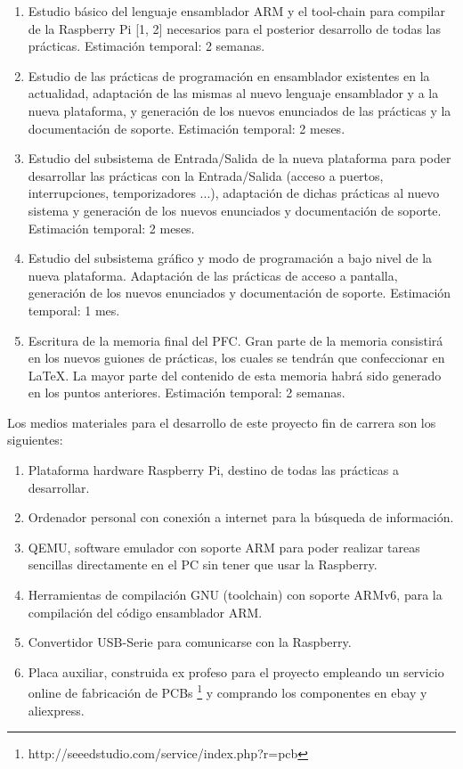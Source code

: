 \begin{enumerate}
  \item Estudio básico del lenguaje ensamblador ARM y el tool-chain para compilar de la
        Raspberry Pi [1, 2] necesarios para el posterior desarrollo de todas las prácticas. 
        Estimación temporal: 2 semanas.

  \item Estudio de las prácticas de programación en ensamblador existentes en la actualidad,
        adaptación de las mismas al nuevo lenguaje ensamblador y a la nueva plataforma,
        y generación de los nuevos enunciados de las prácticas y la documentación de soporte. 
        Estimación temporal: 2 meses.

  \item Estudio del subsistema de Entrada/Salida de la nueva plataforma para poder desarrollar
        las prácticas con la Entrada/Salida (acceso a puertos, interrupciones, temporizadores
        ...), adaptación de dichas prácticas al nuevo sistema y generación de los nuevos
        enunciados y documentación de soporte. 
        Estimación temporal: 2 meses.

  \item Estudio del subsistema gráfico y modo de programación a bajo nivel de la nueva
        plataforma. Adaptación de las prácticas de acceso a pantalla, generación de los
        nuevos enunciados y documentación de soporte. 
        Estimación temporal: 1 mes.

  \item Escritura de la memoria final del PFC. Gran parte de la memoria consistirá en los
        nuevos guiones de prácticas, los cuales se tendrán que confeccionar en LaTeX. La
        mayor parte del contenido de esta memoria habrá sido generado en los puntos anteriores.
        Estimación temporal: 2 semanas.
\end{enumerate}

Los medios materiales para el desarrollo de este proyecto fin de carrera son los siguientes:
\begin{enumerate}
  \item Plataforma hardware Raspberry Pi, destino de todas las prácticas a desarrollar.
  \item Ordenador personal con conexión a internet para la búsqueda de información.
  \item QEMU, software emulador con soporte ARM para poder realizar tareas sencillas
        directamente en el PC sin tener que usar la Raspberry.
  \item Herramientas de compilación GNU (toolchain) con soporte ARMv6, para la compilación
        del código ensamblador ARM.
  \item Convertidor USB-Serie para comunicarse con la Raspberry.
  \item Placa auxiliar, construida ex profeso para el proyecto empleando un servicio online de
        fabricación de PCBs \footnote{http://seeedstudio.com/service/index.php?r=pcb} y
        comprando los componentes en ebay y aliexpress.
\end{enumerate}

\chapterend
